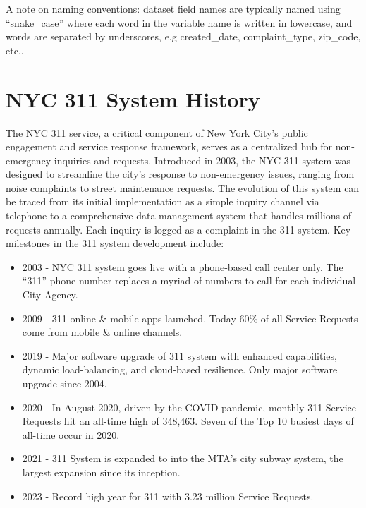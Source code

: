 \documentclass[12pt, titlepage]{article}
\begin{document}
A note on naming conventions: dataset field names are typically named using ``snake\_case'' where
each word in the variable name is written in lowercase, and words are separated by underscores,
e.g created\_date, complaint\_type, zip\_code, etc..   



\section{NYC 311 System History} \label{sec:history}

The NYC 311 service, a critical component of New York City's public
engagement and service response framework, serves as a centralized hub
for non-emergency inquiries and requests. Introduced in 2003, the NYC
311 system was designed to streamline the city's response to
non-emergency issues, ranging from noise complaints to street
maintenance requests. The evolution of this system can be traced from
its initial implementation as a simple inquiry channel via telephone to a
comprehensive data management system that handles millions of requests
annually. Each inquiry is logged as a complaint in the 311 system.
Key milestones in the 311 system development include:

\begin{itemize}
 	\item 2003 - NYC 311 system goes live with a phone-based call center only. The ``311'' phone number replaces a myriad of numbers to call for each individual City Agency.
   	\item 2009 - 311 online \& mobile apps launched. Today 60\% of all Service Requests come from mobile \& online channels.
   	\item 2019 - Major software upgrade of 311 system with enhanced capabilities, dynamic load-balancing, and cloud-based resilience. Only major software upgrade since 2004.	
      \item 2020 - In August 2020, driven by the COVID pandemic, monthly 311 Service Requests hit an all-time high of 348,463. Seven of the Top 10 busiest days of all-time occur in 2020.
      \item 2021 - 311 System is expanded to into the MTA's city subway system, the largest expansion since its inception.
   	\item 2023 - Record high year for 311 with 3.23 million Service Requests.
\end{itemize}
\end{document}
